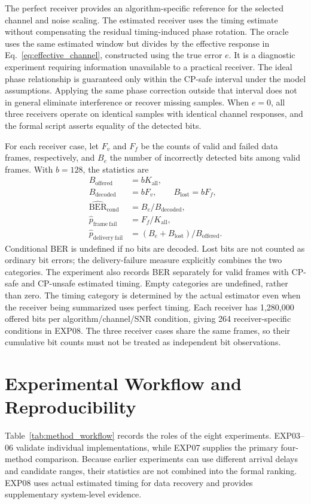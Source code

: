 The perfect receiver provides an algorithm-specific reference for the selected channel and noise scaling. The estimated receiver uses the timing estimate without compensating the residual timing-induced phase rotation. The oracle uses the same estimated window but divides by the effective response in Eq.~\eqref{eq:effective_channel}, constructed using the true error $e$. It is a diagnostic experiment requiring information unavailable to a practical receiver. The ideal phase relationship is guaranteed only within the CP-safe interval under the model assumptions. Applying the same phase correction outside that interval does not in general eliminate interference or recover missing samples. When $e=0$, all three receivers operate on identical samples with identical channel responses, and the formal script asserts equality of the detected bits.

For each receiver case, let $F_v$ and $F_f$ be the counts of valid and failed data frames, respectively, and $B_e$ the number of incorrectly detected bits among valid frames. With $b=128$, the statistics are
\begin{align}
 B_{\mathrm{offered}}&=b K_{\mathrm{all}},\\
 B_{\mathrm{decoded}}&=b F_v,\qquad B_{\mathrm{lost}}=b F_f,\\
 \widehat{\mathrm{BER}}_{\mathrm{cond}}&=B_e/B_{\mathrm{decoded}},\\
 \widehat{p}_{\mathrm{frame\ fail}}&=F_f/K_{\mathrm{all}},\\
 \widehat{p}_{\mathrm{delivery\ fail}}&=(B_e+B_{\mathrm{lost}})/B_{\mathrm{offered}}.
\end{align}
Conditional BER is undefined if no bits are decoded. Lost bits are not counted as ordinary bit errors; the delivery-failure measure explicitly combines the two categories. The experiment also records BER separately for valid frames with CP-safe and CP-unsafe estimated timing. Empty categories are undefined, rather than zero. The timing category is determined by the actual estimator even when the receiver being summarized uses perfect timing. Each receiver has 1,280,000 offered bits per algorithm/channel/SNR condition, giving 264 receiver-specific conditions in EXP08. The three receiver cases share the same frames, so their cumulative bit counts must not be treated as independent bit observations.

\section{Experimental Workflow and Reproducibility}
Table~\ref{tab:method_workflow} records the roles of the eight experiments. EXP03--06 validate individual implementations, while EXP07 supplies the primary four-method comparison. Because earlier experiments can use different arrival delays and candidate ranges, their statistics are not combined into the formal ranking. EXP08 uses actual estimated timing for data recovery and provides supplementary system-level evidence.

